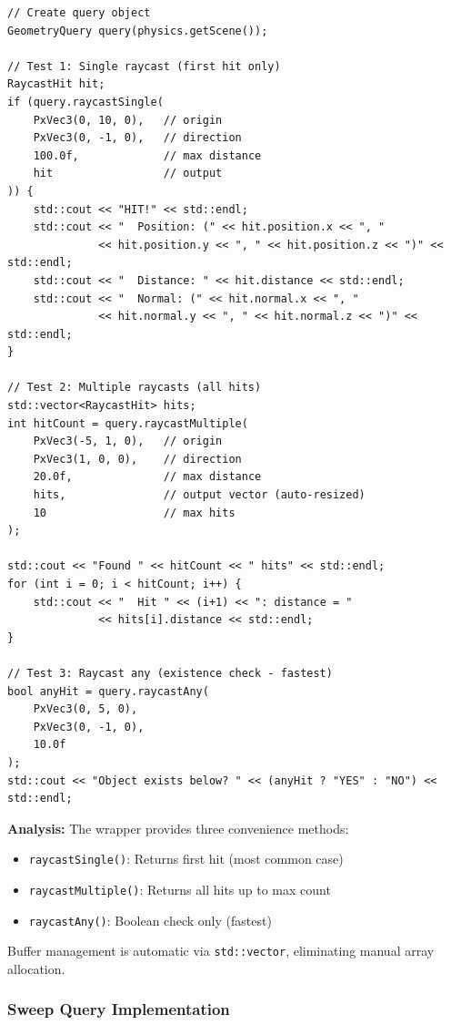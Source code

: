 \begin{lstlisting}[style=cpp, caption=Wrapper Raycast API]
// Create query object
GeometryQuery query(physics.getScene());

// Test 1: Single raycast (first hit only)
RaycastHit hit;
if (query.raycastSingle(
    PxVec3(0, 10, 0),   // origin
    PxVec3(0, -1, 0),   // direction
    100.0f,             // max distance
    hit                 // output
)) {
    std::cout << "HIT!" << std::endl;
    std::cout << "  Position: (" << hit.position.x << ", "
              << hit.position.y << ", " << hit.position.z << ")" << std::endl;
    std::cout << "  Distance: " << hit.distance << std::endl;
    std::cout << "  Normal: (" << hit.normal.x << ", "
              << hit.normal.y << ", " << hit.normal.z << ")" << std::endl;
}

// Test 2: Multiple raycasts (all hits)
std::vector<RaycastHit> hits;
int hitCount = query.raycastMultiple(
    PxVec3(-5, 1, 0),   // origin
    PxVec3(1, 0, 0),    // direction
    20.0f,              // max distance
    hits,               // output vector (auto-resized)
    10                  // max hits
);

std::cout << "Found " << hitCount << " hits" << std::endl;
for (int i = 0; i < hitCount; i++) {
    std::cout << "  Hit " << (i+1) << ": distance = "
              << hits[i].distance << std::endl;
}

// Test 3: Raycast any (existence check - fastest)
bool anyHit = query.raycastAny(
    PxVec3(0, 5, 0),
    PxVec3(0, -1, 0),
    10.0f
);
std::cout << "Object exists below? " << (anyHit ? "YES" : "NO") << std::endl;
\end{lstlisting}

\textbf{Analysis:} The wrapper provides three convenience methods:
\begin{itemize}
    \item \texttt{raycastSingle()}: Returns first hit (most common case)
    \item \texttt{raycastMultiple()}: Returns all hits up to max count
    \item \texttt{raycastAny()}: Boolean check only (fastest)
\end{itemize}

Buffer management is automatic via \texttt{std::vector}, eliminating manual array allocation.

\subsubsection{Sweep Query Implementation}

